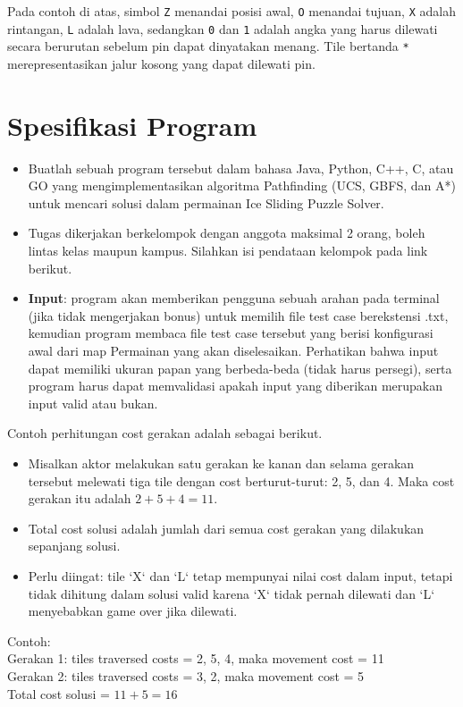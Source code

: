 \noindent
Pada contoh di atas, simbol \texttt{Z} menandai posisi awal, \texttt{O} menandai tujuan, \texttt{X} adalah rintangan, \texttt{L} adalah lava, sedangkan \texttt{0} dan \texttt{1} adalah angka yang harus dilewati secara berurutan sebelum pin dapat dinyatakan menang. Tile bertanda \texttt{*} merepresentasikan jalur kosong yang dapat dilewati pin.

\section{Spesifikasi Program}
\begin{itemize}
    \item  Buatlah sebuah program tersebut dalam bahasa Java, Python, C++, C, atau GO yang mengimplementasikan algoritma Pathfinding (UCS, GBFS, dan A*) untuk mencari solusi dalam permainan Ice Sliding Puzzle Solver.
    \item Tugas dikerjakan berkelompok dengan anggota maksimal 2 orang, boleh lintas kelas maupun kampus. Silahkan isi pendataan kelompok pada link berikut.
    \item  \textbf{Input}: program akan memberikan pengguna sebuah arahan pada terminal (jika tidak mengerjakan bonus) untuk memilih file test case berekstensi .txt, kemudian program membaca file test case tersebut yang berisi konfigurasi awal dari map Permainan yang akan diselesaikan. Perhatikan bahwa input dapat memiliki ukuran papan yang berbeda-beda (tidak harus persegi), serta program harus dapat memvalidasi apakah input yang diberikan merupakan input valid atau bukan.
\end{itemize}

Contoh perhitungan cost gerakan adalah sebagai berikut.
\begin{itemize}
    \item Misalkan aktor melakukan satu gerakan ke kanan dan selama gerakan tersebut melewati tiga tile dengan cost berturut-turut: 2, 5, dan 4. Maka cost gerakan itu adalah $2 + 5 + 4 = 11$.
    \item Total cost solusi adalah jumlah dari semua cost gerakan yang dilakukan sepanjang solusi.
    \item Perlu diingat: tile `X` dan `L` tetap mempunyai nilai cost dalam input, tetapi tidak dihitung dalam solusi valid karena `X` tidak pernah dilewati dan `L` menyebabkan game over jika dilewati.
\end{itemize}

\begin{tcolorbox}[
        colback=black!3,
        colframe=black!60,
        boxrule=0.6pt,
        left=1mm,
        right=1mm,
        top=1mm,
        bottom=1mm,
        listing only,
        listing options={basicstyle=\ttfamily\small, columns=fullflexible, keepspaces=true}
    ]
    Contoh: \\
    Gerakan 1: tiles traversed costs = 2, 5, 4, maka movement cost = 11 \\
    Gerakan 2: tiles traversed costs = 3, 2, maka movement cost = 5 \\
    Total cost solusi = $11 + 5 = 16$
\end{tcolorbox}

